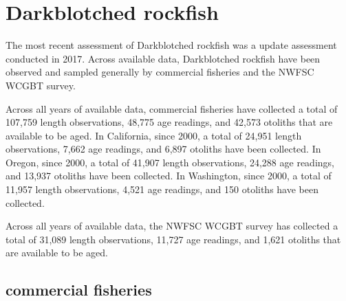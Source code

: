 \documentclass[11pt,
  english,
  letterpaper,
]{article}
\begin{document}

\hypertarget{darkblotched-rockfish}{%
\section{Darkblotched rockfish}\label{darkblotched-rockfish}}

\leavevmode\tagmcend\tagstructend


The most recent assessment of Darkblotched rockfish was a update assessment conducted in 2017. Across available data, Darkblotched rockfish have been observed and sampled generally by commercial fisheries and the NWFSC WCGBT survey.

\leavevmode\tagmcend\tagstructend\par


Across all years of available data, commercial fisheries have collected a total of 107,759 length observations, 48,775 age readings, and 42,573 otoliths that are available to be aged. In California, since 2000, a total of 24,951 length observations, 7,662 age readings, and 6,897 otoliths have been collected. In Oregon, since 2000, a total of 41,907 length observations, 24,288 age readings, and 13,937 otoliths have been collected. In Washington, since 2000, a total of 11,957 length observations, 4,521 age readings, and 150 otoliths have been collected.

\leavevmode\tagmcend\tagstructend\par


Across all years of available data, the NWFSC WCGBT survey has collected a total of 31,089 length observations, 11,727 age readings, and 1,621 otoliths that are available to be aged.

\leavevmode\tagmcend\tagstructend\par


\hypertarget{commercial-fisheries-17}{%
\subsection{commercial fisheries}\label{commercial-fisheries-17}}

\leavevmode\tagmcend\tagstructend
\end{document}
